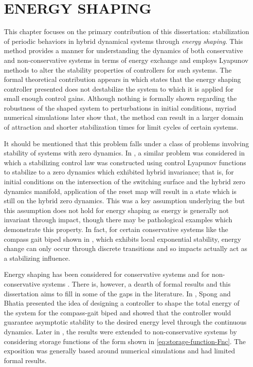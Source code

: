 \chapter{\uppercase{Energy Shaping}} \label{ch:energy-shaping}

This chapter focuses on the primary contribution of this dissertation:
stabilization of periodic behaviors in hybrid dynamical systems through {\em
  energy shaping}.
% 
This method provides a manner for understanding the dynamics of both
conservative and  non-conservative systems in terms of energy exchange and
employs Lyapunov methods to alter the stability properties of controllers for
such systems.
% 
The formal theoretical contribution appears in 
which states that the energy shaping controller presented does not destabilize
the system to which it is applied for small enough control gains.
% 
Although nothing is formally shown regarding the robustness of the shaped system
to perturbations in initial conditions, myriad numerical simulations later show
that, the method can result in a larger domain of attraction and shorter
stabilization times for limit cycles of certain systems.

It should be mentioned that this problem falls under a class of problems
involving stability of systems with zero dynamics.
% 
In \cite{Ames2014}, a similar problem was considered in which a stabilizing
control law was constructed using control Lyapunov functions to stabilize to a
zero dynamics which exhibited hybrid invariance;
% 
that is, for initial conditions on the intersection of the switching surface and
the hybrid zero dynamics manifold, application of the reset map will result in a
state which is still on the hybrid zero dynamics.
% 
This was a key assumption underlying the \cite{Ames2014} but this assumption
does not hold for energy shaping as energy is generally not invariant through
impact, though there may be pathological examples which demonstrate this
property.
% 
In fact, for certain conservative systems like the compass gait biped shown in
, which exhibits local exponential
stability, energy change can only occur through discrete transitions and so
impacts actually act as a stabilizing influence.

Energy shaping has been considered for conservative systems \cite{Spong2003} and
for non-conservative systems \cite{Spong2007}.
% 
There is, however, a dearth of formal results and this dissertation aims to fill
in some of the gaps in the literature.
% 
In \cite{Spong2003}, Spong and Bhatia presented the idea of designing a
controller to shape the total energy of the system for the compass-gait biped
and showed that the controller would guarantee asymptotic stability to the
desired energy level through the continuous dynamics.
% 
Later in \cite{Spong2007}, the results were extended to non-conservative systems
by considering storage functions of the form shown in
\eqref{eq:storage-function-Fnc}.
% 
The exposition was generally based around numerical simulations and had limited
formal results.

